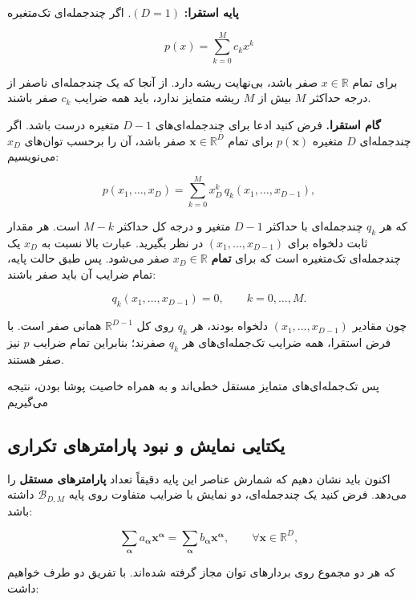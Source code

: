 \documentclass[12pt,a4paper]{article}
\begin{document}
\textbf{پایه استقرا:} $(D=1)$.
اگر چندجمله‌ای تک‌متغیره

\[
p(x)=\sum_{k=0}^{M}c_kx^k
\]

برای تمام $x\in\mathbb{R}$ صفر باشد،
بی‌نهایت ریشه دارد. از آنجا که یک چندجمله‌ای
ناصفر از درجه حداکثر $M$ بیش از $M$ ریشه متمایز
ندارد، باید همه ضرایب $c_k$ صفر باشند.

\textbf{گام استقرا.}
فرض کنید ادعا برای چندجمله‌ای‌های $D-1$ متغیره
درست باشد. اگر چندجمله‌ای $D$ متغیره
$p(\mathbf{x})$ برای تمام $\mathbf{x}\in\mathbb{R}^{D}$
صفر باشد، آن را برحسب توان‌های $x_D$ می‌نویسیم:

\[
p(x_1,\ldots,x_D)
=\sum_{k=0}^{M}x_D^k\,
q_k(x_1,\ldots,x_{D-1}),
\]

که هر $q_k$ چندجمله‌ای با حداکثر $D-1$ متغیر
و درجه کل حداکثر $M-k$ است.
هر مقدار ثابت دلخواه برای
$(x_1,\ldots,x_{D-1})$ در نظر بگیرید.
عبارت بالا نسبت به $x_D$ یک چندجمله‌ای تک‌متغیره
است که برای \textbf{تمام} $x_D\in\mathbb{R}$ صفر می‌شود.
پس طبق حالت پایه، تمام ضرایب آن باید صفر باشند:

\[
q_k(x_1,\ldots,x_{D-1})=0,
\qquad k=0,\ldots,M.
\]

چون مقادیر $(x_1,\ldots,x_{D-1})$ دلخواه بودند،
هر $q_k$ روی کل $\mathbb{R}^{D-1}$ همانی صفر است.
با فرض استقرا، همه ضرایب تک‌جمله‌ای‌های هر $q_k$
صفرند؛ بنابراین تمام ضرایب $p$ نیز صفر هستند.

پس تک‌جمله‌ای‌های متمایز مستقل خطی‌اند و به همراه
خاصیت پوشا بودن، نتیجه می‌گیریم

\begin{center}
\end{center}

\subsection{یکتایی نمایش و نبود پارامترهای تکراری}

اکنون باید نشان دهیم که شمارش عناصر این پایه
دقیقاً تعداد \textbf{پارامترهای مستقل} را می‌دهد.
فرض کنید یک چندجمله‌ای، دو نمایش با ضرایب متفاوت
روی پایه $\mathcal{B}_{D,M}$ داشته باشد:

\[
\sum_{\boldsymbol{\alpha}}a_{\boldsymbol{\alpha}}
\mathbf{x}^{\boldsymbol{\alpha}}
=
\sum_{\boldsymbol{\alpha}}b_{\boldsymbol{\alpha}}
\mathbf{x}^{\boldsymbol{\alpha}},
\qquad\forall\mathbf{x}\in\mathbb{R}^{D},
\]

که هر دو مجموع روی بردارهای توان مجاز گرفته شده‌اند.
با تفریق دو طرف خواهیم داشت:
\end{document}
